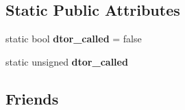 \subsection*{Static Public Attributes}
\begin{DoxyCompactItemize}
\item 
\mbox{\label{struct_y_a4fab03d751a5c95bf570f493cce13758}} 
static bool {\bfseries dtor\+\_\+called} = false
\item 
\mbox{\label{struct_y_a4fab03d751a5c95bf570f493cce13758}} 
static unsigned {\bfseries dtor\+\_\+called}
\end{DoxyCompactItemize}
\subsection*{Friends}

